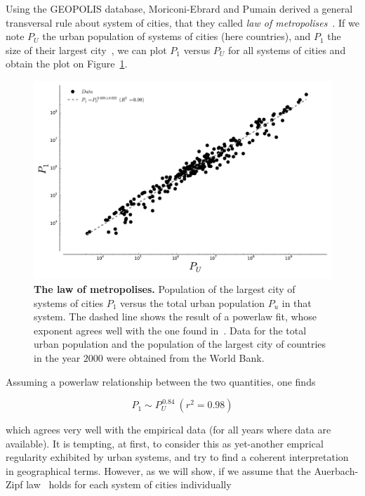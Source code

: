 Using the GEOPOLIS database, Moriconi-Ebrard and Pumain derived a general transversal rule about system
of cities, that they called \emph{law of metropolises}~\cite{Pumain:1997}. If we
note $P_U$ the urban population of systems of cities (here countries), and $P_1$ the size of
their largest city~, we can
plot $P_1$ versus $P_U$ for all systems of cities and obtain the plot on
Figure~\ref{fig:metropolises}.

\begin{figure}
    \centering
    \includegraphics[width=\textwidth]{gfx/chapter-intro/law_metropolises.pdf}
    \caption{{\bf The law of metropolises.} Population of the largest city of
    systems of cities $P_1$ versus the total urban population $P_u$ in that
system. The dashed line shows the result of a powerlaw fit, whose exponent
agrees well with the one found in~\cite{Pumain:1997}. Data for the total urban
population and the population of the largest city of countries in the year
$2000$ were obtained from
the World Bank.\label{fig:metropolises}}
\end{figure}

Assuming a powerlaw relationship between the two quantities, one finds

\begin{equation}
    P_1 \sim P_U^{\,0.84}\:(r^2=0.98)
    \label{eq:metropolis}
\end{equation}

which agrees very well with the empirical data (for all years where data are
available). It is tempting, at first, to consider this as yet-another emprical
regularity exhibited by urban systems, and try to find a coherent interpretation
in geographical terms. However, as we will show, if we assume that the Auerbach-Zipf
law~\cite{Auerbach:1913,Zipf:1949} holds for each system of cities
individually

